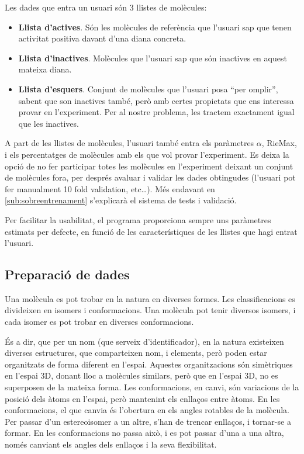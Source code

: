 Les dades que entra un usuari són 3 llistes de molècules:

\begin{itemize}
	\item \textbf{Llista d'actives}.  Són les molècules de referència que l'usuari sap
	que tenen activitat positiva davant d'una diana concreta.
	\item \textbf{Llista d'inactives}.  Molècules que l'usuari sap que són inactives en
	aquest mateixa diana.
	\item \textbf{Llista d'esquers}.  Conjunt de molècules que l'usuari posa ``per
	omplir'', sabent que son inactives també, però amb certes propietats que ens interessa provar en
	l'experiment.   Per al nostre problema, les tractem exactament igual que les inactives.

\end{itemize}

A part de les llistes de molècules, l'usuari també entra els paràmetres $\alpha$,
RieMax, i els percentatges de molècules amb els que vol provar l'experiment.  Es
deixa la opció de no fer participar totes les molècules en l'experiment deixant 
un conjunt de molècules fora, per després avaluar i validar les dades obtingudes
(l'usuari pot fer manualment 10 fold validation, etc\dots).  Més endavant en 
\ref{sub:sobreentrenament} s'explicarà el sistema de tests i validació.

Per facilitar la usabilitat, el programa proporciona sempre uns paràmetres
estimats per defecte, en funció de les característiques de les llistes que hagi
entrat l'usuari. 

\subsection{Preparació de dades} %
\label{sub:preparacio de dades}
Una molècula es pot trobar en la natura en diverses formes.  Les classificacions
es divideixen en isomers i conformacions.  Una molècula pot tenir diversos
isomers, i cada isomer es pot trobar en  diverses conformacions.

És a dir, que per un nom (que serveix d'identificador), en la natura existeixen
diverses estructures, que comparteixen nom, i elements, però poden estar
organitzats de forma diferent en l'espai. Aquestes organitzacions són
simètriques en l'espai 3D, donant lloc a molècules similars, però que en l'espai
3D, no es superposen de la mateixa forma.  Les conformacions, en canvi, són
variacions de la posició dels àtoms en l'espai, però mantenint els enllaços
entre àtoms. En les conformacions, el que canvia és l'obertura en els angles
rotables de la molècula.  Per passar d'un estereoisomer a un altre, s'han de
trencar enllaços, i tornar-se a formar.  En les conformacions no passa això, i
es pot passar d'una a una altra, només canviant els angles dels enllaços i la
seva flexibilitat. 

